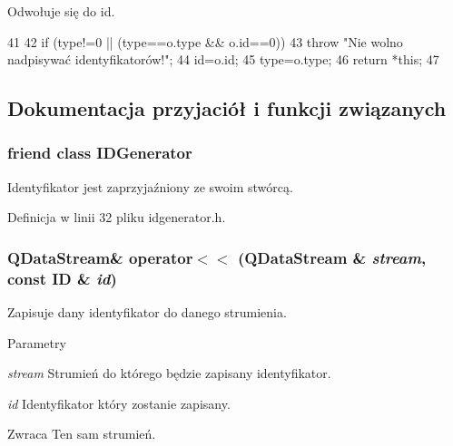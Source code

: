 Odwołuje się do id.




\begin{DoxyCode}
41 {
42     if (type!=0 || (type==o.type && o.id==0))
43         throw "Nie wolno nadpisywać identyfikatorów!";
44     id=o.id;
45     type=o.type;
46     return *this;
47 }
\end{DoxyCode}




\subsection{Dokumentacja przyjaciół i funkcji związanych}
\hypertarget{classIDGenerator_1_1ID_a85bc66475d72826ee03d9f388d7fcd0f}{
\subsubsection[{IDGenerator}]{\setlength{\rightskip}{0pt plus 5cm}friend class {\bf IDGenerator}}}
\label{classIDGenerator_1_1ID_a85bc66475d72826ee03d9f388d7fcd0f}


Identyfikator jest zaprzyjaźniony ze swoim stwórcą. 



Definicja w linii 32 pliku idgenerator.h.

\hypertarget{classIDGenerator_1_1ID_ac7c84abfa059c0c94c7a0c53ffe2b4fc}{
\subsubsection[{operator$<$$<$}]{\setlength{\rightskip}{0pt plus 5cm}QDataStream\& operator$<$$<$ (QDataStream \& {\em stream}, \/  const {\bf ID} \& {\em id})}}
\label{classIDGenerator_1_1ID_ac7c84abfa059c0c94c7a0c53ffe2b4fc}


Zapisuje dany identyfikator do danego strumienia. 


\begin{DoxyParams}{Parametry}
\item[{\em stream}]Strumień do którego będzie zapisany identyfikator. \item[{\em id}]Identyfikator który zostanie zapisany. \end{DoxyParams}
\begin{DoxyReturn}{Zwraca}
Ten sam strumień. 
\end{DoxyReturn}


